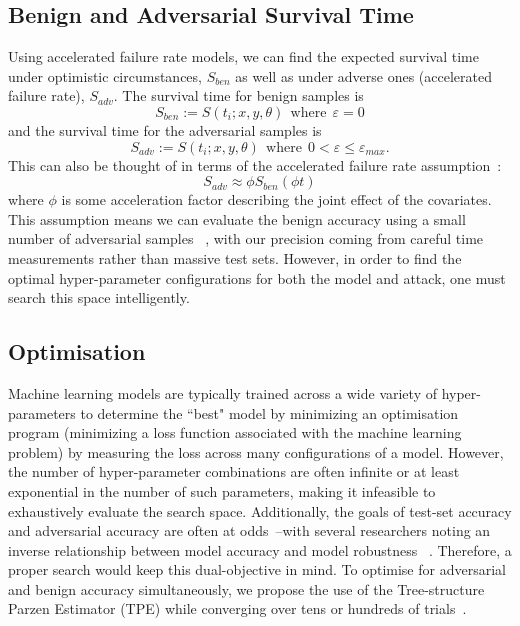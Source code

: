 \documentclass[conference]{IEEEtran}
\begin{document}
\subsection{Benign and Adversarial Survival Time}
\label{accelerated}
Using accelerated failure rate models, we can find the expected survival time under optimistic circumstances, $S_{ben}$ as well as under adverse ones (accelerated failure rate), $S_{adv}$. The survival time for benign samples is
$$
    S_{ben} := S(t_i; x, y, \theta) \mathrm{~~where~~} \varepsilon = 0
$$
and the survival time for the adversarial samples is
$$
    S_{adv} :=  S(t_i; x, y, \theta) \mathrm{~~where~~} 0 < \varepsilon \leq \varepsilon_{max}.
$$
This can also be thought of in terms of the accelerated failure rate assumption~\cite{kleinbaum1996survival}:
\begin{equation}
S_{adv} \approx  \phi S_{ben}(\phi t)
\label{assumption}
\end{equation}
where $\phi$ is some acceleration factor describing the joint effect of the covariates. This assumption means we can evaluate the benign accuracy using a small number of adversarial samples ~\cite{kleinbaum1996survival}, with our precision coming from careful time measurements rather than massive test sets.
However, in order to find the optimal hyper-parameter configurations for both the model and attack, one must search this space intelligently.


\subsection{Optimisation}
\label{optimisation}
Machine learning models are typically trained across a wide variety of hyper-parameters to determine the ``best" model by minimizing an optimisation program (minimizing a loss function associated with the machine learning problem) by measuring the loss across many configurations of a model. However, the number of hyper-parameter combinations are often infinite or at least exponential in the number of such parameters,
making it infeasible to exhaustively evaluate the search space. Additionally, the goals of test-set accuracy and adversarial accuracy are often at odds~\cite{carlini_towards_2017}--with several researchers noting an inverse relationship between model accuracy and model robustness ~\cite{carlini_towards_2017,meyers,dohmatob_generalized_2019}. Therefore, a proper search would keep this dual-objective in mind.
To optimise for adversarial and benign accuracy simultaneously, we propose the use of the Tree-structure Parzen Estimator (TPE) while converging  over tens or hundreds of trials~\cite{ozaki2020multiobjective}.
\end{document}
